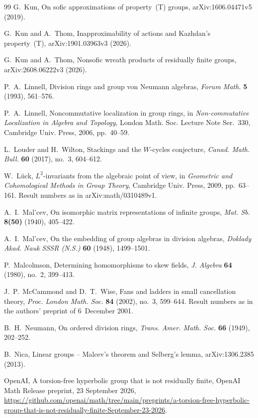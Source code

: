 \documentclass[11pt]{article}
\theoremstyle{definition}
\theoremstyle{remark}
\numberwithin{equation}{section}
\begin{document}
\begin{thebibliography}{99}
G.~Kun,
On sofic approximations of property~(T) groups,
arXiv:1606.04471v5 (2019).

G.~Kun and A.~Thom,
Inapproximability of actions and Kazhdan's property~(T),
arXiv:1901.03963v3 (2026).

G.~Kun and A.~Thom,
Nonsofic wreath products of residually finite groups,
arXiv:2608.06222v3 (2026).

P.~A.~Linnell,
Division rings and group von Neumann algebras,
\emph{Forum Math.} \textbf{5} (1993), 561--576.

P.~A.~Linnell,
Noncommutative localization in group rings,
in \emph{Non-commutative Localization in Algebra and Topology}, London Math. Soc. Lecture Note Ser.~330, Cambridge Univ. Press, 2006, pp.~40--59.

L.~Louder and H.~Wilton,
Stackings and the $W$-cycles conjecture,
\emph{Canad. Math. Bull.} \textbf{60} (2017), no.~3, 604--612.

W.~L\"uck,
$L^2$-invariants from the algebraic point of view,
in \emph{Geometric and Cohomological Methods in Group Theory}, Cambridge Univ. Press, 2009, pp.~63--161. Result numbers as in arXiv:math/0310489v1.

A.~I.~Mal'cev,
On isomorphic matrix representations of infinite groups,
\emph{Mat. Sb.} \textbf{8(50)} (1940), 405--422.

A.~I.~Mal'cev,
On the embedding of group algebras in division algebras,
\emph{Doklady Akad. Nauk SSSR (N.S.)} \textbf{60} (1948), 1499--1501.

P.~Malcolmson,
Determining homomorphisms to skew fields,
\emph{J. Algebra} \textbf{64} (1980), no.~2, 399--413.

J.~P.~McCammond and D.~T.~Wise,
Fans and ladders in small cancellation theory,
\emph{Proc. London Math. Soc.} \textbf{84} (2002), no.~3, 599--644. Result numbers as in the authors' preprint of 6~December 2001.

B.~H.~Neumann,
On ordered division rings,
\emph{Trans. Amer. Math. Soc.} \textbf{66} (1949), 202--252.

B.~Nica,
Linear groups -- Malcev's theorem and Selberg's lemma,
arXiv:1306.2385 (2013).

OpenAI,
A torsion-free hyperbolic group that is not residually finite,
OpenAI Math Release preprint, 23 September 2026, \url{https://github.com/openai/math/tree/main/preprints/a-torsion-free-hyperbolic-group-that-is-not-residually-finite-September-23-2026}.


\end{thebibliography}
\end{document}

